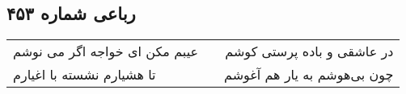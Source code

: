 \begin{center}
\section*{رباعی شماره ۴۵۳}
\label{sec:sh453}
\begin{longtable}{l p{0.5cm} r}
عیبم مکن ای خواجه اگر می نوشم
&&
در عاشقی و باده پرستی کوشم
\\
تا هشیارم نشسته با اغیارم
&&
چون بی‌هوشم به یار هم آغوشم
\\
\end{longtable}
\end{center}
